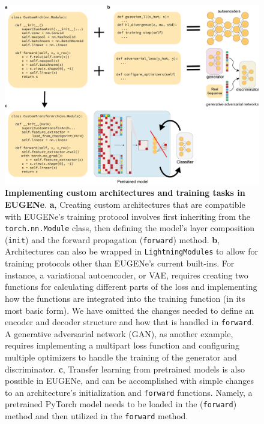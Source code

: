 \begin{figure}[p]
    \centering
    \includegraphics[width=\textwidth]{1_figures-and-files/suppfigure5.png}
    \caption[Custom model development in EUGENe]{\textbf{Implementing custom architectures and training tasks in EUGENe}. \textbf{a}, Creating custom architectures that are compatible with EUGENe’s training protocol involves first inheriting from the \texttt{torch.nn.Module} class, then defining the model’s layer composition (\texttt{init}) and the forward propagation (\texttt{forward}) method. \textbf{b}, Architectures can also be wrapped in \texttt{LightningModules} to allow for training protocols other than EUGENe’s current built-ins. For instance, a variational autoencoder, or VAE, requires creating two functions for calculating different parts of the loss and implementing how the functions are integrated into the training function (in its most basic form). We have omitted the changes needed to define an encoder and decoder structure and how that is handled in \texttt{forward}. A generative adversarial network (GAN), as another example, requires implementing a multipart loss function and configuring multiple optimizers to handle the training of the generator and discriminator. \textbf{c}, Transfer learning from pretrained models is also possible in EUGENe, and can be accomplished with simple changes to an architecture’s initialization and \texttt{forward} functions. Namely, a pretrained PyTorch model needs to be loaded in the (\texttt{forward}) method and then utilized in the \texttt{forward} method.}
    \label{fig:supplementary_5}
\end{figure}

